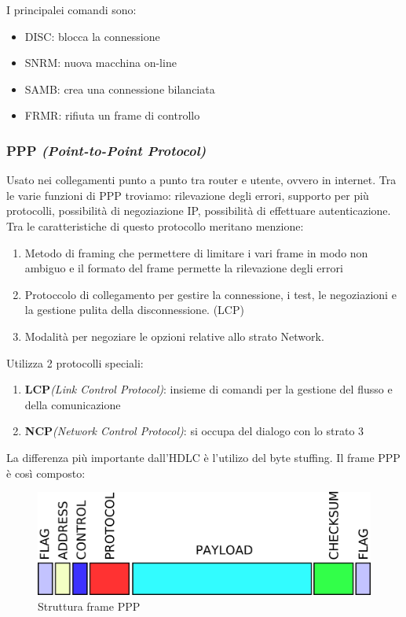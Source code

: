 I principalei comandi sono:
\begin{itemize}
\item{DISC: blocca la connessione}
\item{SNRM: nuova macchina on-line}
\item{SAMB: crea una connessione bilanciata}
\item{FRMR: rifiuta un frame di controllo}
\end{itemize}

\subsubsection{PPP \textit{(Point-to-Point Protocol)}}
Usato nei collegamenti punto a punto tra router e utente, ovvero in internet. Tra le varie funzioni di PPP troviamo: rilevazione degli errori, supporto per più protocolli, possibilità di negoziazione IP, possibilità di effettuare autenticazione. Tra le caratteristiche di questo protocollo meritano menzione:
\begin{enumerate}
\item{Metodo di framing che permettere di limitare i vari frame in modo non ambiguo e il formato del frame permette la rilevazione degli errori}
\item{Protoccolo di collegamento per gestire la connessione, i test, le negoziazioni e la gestione pulita della disconnessione. (LCP)}
\item{Modalità per negoziare le opzioni relative allo strato Network.}
\end{enumerate}
Utilizza 2 protocolli speciali:
\begin{enumerate}
\item{\textbf{LCP}\textit{(Link Control Protocol)}: insieme di comandi per la gestione del flusso e della comunicazione}
\item{\textbf{NCP}\textit{(Network Control Protocol)}: si occupa del dialogo con lo strato 3}
\end{enumerate}
La differenza più importante dall'HDLC è l'utilizo del byte stuffing.
Il frame PPP è così composto:
\begin{figure}[htbp]
\centering
\includegraphics[scale=0.3]{images/ppp.png}
\caption{Struttura frame PPP}
\end{figure}
